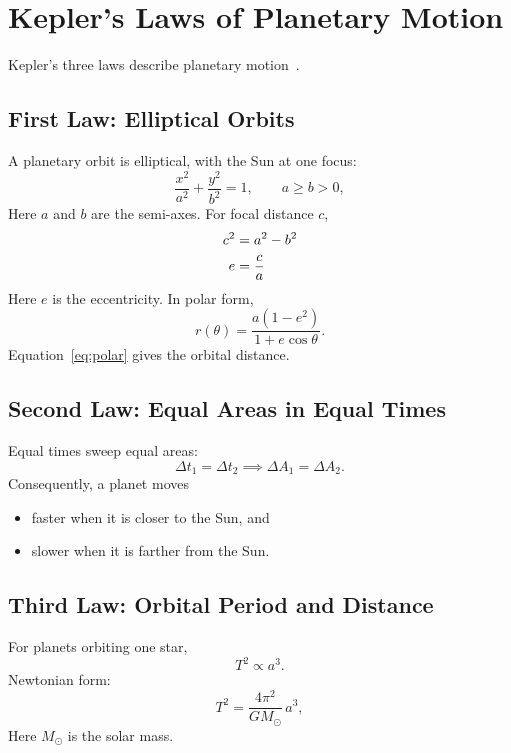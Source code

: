 \documentclass[11pt]{article}
\begin{document}
\section{Kepler's Laws of Planetary Motion}
Kepler's three laws describe planetary motion~\cite{nasa_kepler}.

\subsection{First Law: Elliptical Orbits}
A planetary orbit is elliptical, with the Sun at one focus:
\begin{equation}
    \frac{x^2}{a^2} + \frac{y^2}{b^2} = 1, \qquad a \ge b > 0,
\end{equation}
Here $a$ and $b$ are the semi-axes.
For focal distance $c$,
\begin{align}
    c^2 &= a^2 - b^2 \notag \\
    e   &= \frac{c}{a}
\end{align}
Here $e$ is the eccentricity.
In polar form,
\begin{equation}\label{eq:polar}
    r(\theta) = \frac{a(1-e^2)}{1 + e\cos\theta}.
\end{equation}
Equation~\eqref{eq:polar} gives the orbital distance.

\subsection{Second Law: Equal Areas in Equal Times}
Equal times sweep equal areas:
\begin{equation}
    \Delta t_1 = \Delta t_2 \implies \Delta A_1 = \Delta A_2.
\end{equation}
Consequently, a planet moves
\begin{itemize}[label=$\diamond$]
    \item faster when it is closer to the Sun, and
    \item slower when it is farther from the Sun.
\end{itemize}

\subsection{Third Law: Orbital Period and Distance}
For planets orbiting one star,
\begin{equation}
    T^2 \propto a^3.
\end{equation}
Newtonian form:
\[
    T^2 = \frac{4\pi^2}{GM_\odot}\, a^3,
\]
Here $M_\odot$ is the solar mass.
\end{document}
